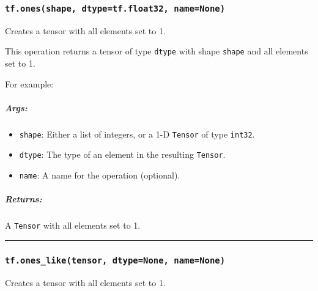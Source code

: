 \subsubsection{\texorpdfstring{\texttt{tf.ones(shape,\ dtype=tf.float32,\ name=None)}
}{tf.ones(shape, dtype=tf.float32, name=None) }}\label{tf.onesshape-dtypetf.float32-namenone}

Creates a tensor with all elements set to 1.

This operation returns a tensor of type \texttt{dtype} with shape
\texttt{shape} and all elements set to 1.

For example:

\begin{Shaded}
\begin{Highlighting}[]
\NormalTok{tf.ones([}\NormalTok{, }\NormalTok{], int32) }\OperatorTok{==>} \NormalTok{[[}\NormalTok{, }\NormalTok{, }\NormalTok{], [}\NormalTok{, }\NormalTok{, }\NormalTok{]]}
\end{Highlighting}
\end{Shaded}

\subparagraph{Args: }\label{args-2}

\begin{itemize}
\tightlist
\item
  \texttt{shape}: Either a list of integers, or a 1-D \texttt{Tensor} of
  type \texttt{int32}.
\item
  \texttt{dtype}: The type of an element in the resulting
  \texttt{Tensor}.
\item
  \texttt{name}: A name for the operation (optional).
\end{itemize}

\subparagraph{Returns: }\label{returns-2}

A \texttt{Tensor} with all elements set to 1.

\begin{center}\rule{0.5\linewidth}{\linethickness}\end{center}

\subsubsection{\texorpdfstring{\texttt{tf.ones\_like(tensor,\ dtype=None,\ name=None)}
}{tf.ones\_like(tensor, dtype=None, name=None) }}\label{tf.onesux5fliketensor-dtypenone-namenone}

Creates a tensor with all elements set to 1.

